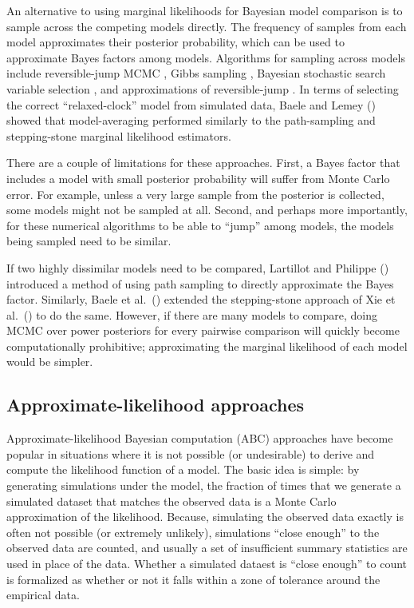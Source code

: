 An alternative to using marginal likelihoods for Bayesian model comparison is
to sample across the competing models directly.
The frequency of samples from each model approximates their posterior
probability, which can be used to approximate Bayes factors among models.
Algorithms for sampling across models include reversible-jump MCMC
\citep{Green1995}, Gibbs sampling \citep{Neal2000}, Bayesian stochastic search
variable selection \citep{George1993,Kuo1998}, and approximations of reversible-jump
\citep{Jones2015}.
In terms of selecting the correct ``relaxed-clock'' model from simulated data,
Baele and Lemey (\citeyear{Baele2014}) showed that model-averaging performed
similarly to the path-sampling and stepping-stone marginal likelihood
estimators.

There are a couple of limitations for these approaches.
First, a Bayes factor that includes a model with small posterior probability
will suffer from Monte Carlo error.
For example, unless a very large sample from the posterior is collected, some
models might not be sampled at all.
Second, and perhaps more importantly, for these numerical algorithms to be able
to ``jump'' among models, the models being sampled need to be similar.

If two highly dissimilar models need to be compared,
Lartillot and Philippe (\citeyear{Lartillot2006}) introduced a method of using
path sampling to directly approximate the Bayes factor.
Similarly, Baele et al.\ (\citeyear{Baele2013}) extended the stepping-stone
approach of Xie et al.\ (\citeyear{Xie2011}) to do the same.
However, if there are many models to compare, doing MCMC over power posteriors
for every pairwise comparison will quickly become computationally prohibitive;
approximating the marginal likelihood of each model would be simpler.

\subsection{Approximate-likelihood approaches}

Approximate-likelihood Bayesian computation (ABC) approaches
\citep{Tavare1997,Beaumont2002} have become popular in situations where it is
not possible (or undesirable) to derive and compute the likelihood function of
a model.
The basic idea is simple: by generating simulations under the model, the
fraction of times that we generate a simulated dataset that matches the
observed data is a Monte Carlo approximation of the likelihood.
Because, simulating the observed data exactly is often not possible (or extremely
unlikely), simulations ``close enough'' to the observed data are
counted, and usually a set of insufficient summary statistics are used in place
of the data.
Whether a simulated dataest is ``close enough'' to count is formalized as
whether or not it falls within a zone of tolerance around the empirical data.


